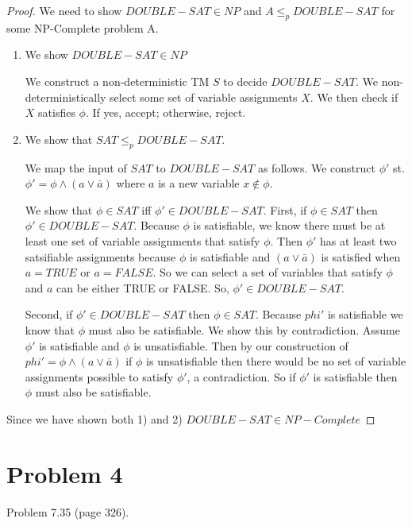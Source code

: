 \documentclass[11pt]{article}
\begin{document}
\begin{proof}

We need to show $DOUBLE-SAT \in NP$ and $A \leq _p DOUBLE-SAT$ for some NP-Complete problem A.

\begin{enumerate}[label=\alph*)]

\item We show $DOUBLE-SAT \in NP$

We construct a non-deterministic TM $S$ to decide $DOUBLE-SAT$. We non-deterministically select some set of variable assignments $X$. We then check if $X$ satisfies $\phi$. If yes, accept; otherwise, reject.

\item We show that $SAT \leq _p DOUBLE-SAT$. 

We map the input of $SAT$ to $DOUBLE-SAT$ as follows. We construct $\phi '$ st. $\phi ' = \phi \wedge (a \vee \bar{a})$ where $a$ is a new variable $x \notin \phi$. 

We show that $\phi \in SAT$ iff $\phi ' \in DOUBLE-SAT$.
First, if $\phi \in SAT$ then $\phi ' \in DOUBLE-SAT$. Because $\phi$ is satisfiable, we know there must be at least one set of variable assignments that satisfy $\phi$. Then $\phi '$ has at least two satsifiable assignments because $\phi$ is satisfiable and $(a \vee \bar{a})$ is satisfied when $a = TRUE$ or $a = FALSE$. So we can select a set of variables that satisfy $\phi$ and $a$ can be either TRUE or FALSE. So, $\phi ' \in DOUBLE-SAT$.

Second, if $\phi ' \in DOUBLE-SAT$ then $\phi \in SAT$. Because $phi '$ is satisfiable we know that $\phi$ must also be satisfiable. We show this by contradiction. Assume $\phi '$ is satisfiable and $\phi$ is unsatisfiable. Then by our construction of $phi' = \phi \wedge (a \vee \bar{a})$ if $\phi$ is unsatisfiable then there would be no set of variable assignments possible to satisfy $\phi '$, a contradiction. So if $\phi '$ is satisfiable then $\phi$ must also be satisfiable.
\end{enumerate}

Since we have shown both 1) and 2) $DOUBLE-SAT \in NP-Complete$
\end{proof}


\newpage
\section*{Problem 4}

Problem 7.35 (page 326).
\end{document}
